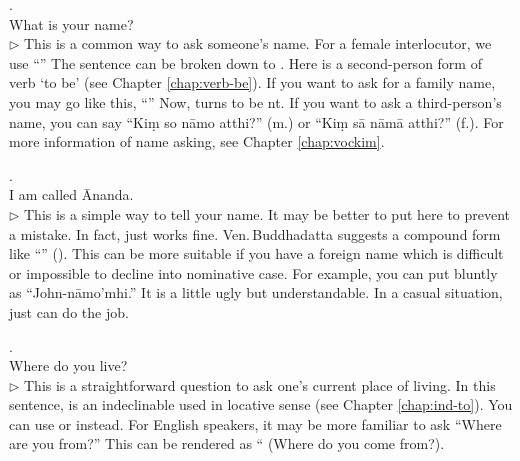 \medskip
{}. \\
\hspace*{10mm}What is your name?\\
{\small $\triangleright$ This is a common way to ask someone's name. For a female interlocutor, we use ``'' The sentence can be broken down to . Here  is a second-person form of verb `to be' (see Chapter \ref{chap:verb-be}). If you want to ask for a family name, you may go like this, ``'' Now,  turns to be nt. If you want to ask a third-person's name, you can say ``Ki\d m so n\=amo atthi?'' (m.) or ``Ki\d m s\=a n\=am\=a atthi?'' (f.). For more information of name asking, see Chapter \ref{chap:vockim}.}

\medskip
{}. \\
\hspace*{10mm}I am called \=Ananda.\\
{\small $\triangleright$ This is a simple way to tell your name. It may be better to put  here to prevent a mistake. In fact, just  works fine. Ven.\,Buddhadatta suggests a compound form like ``'' (). This can be more suitable if you have a foreign name which is difficult or impossible to decline into nominative case. For example, you can put bluntly as ``John-n\=amo'mhi.'' It is a little ugly but understandable. In a casual situation, just  can do the job.}

\medskip
{}. \\
\hspace*{10mm}Where do you live?\\
{\small $\triangleright$ This is a straightforward question to ask one's current place of living. In this sentence,  is an indeclinable used in locative sense (see Chapter \ref{chap:ind-to}). You can use  or  instead. For English speakers, it may be more familiar to ask ``Where are you from?'' This can be rendered as `` (Where do you come from?).}

